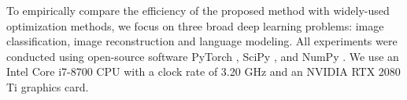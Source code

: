 To empirically compare the efficiency of the proposed method with widely-used optimization methods, we focus on three broad deep learning problems: image classification, image reconstruction and language modeling. All experiments were conducted using open-source software PyTorch \citep{NEURIPS2019_9015}, SciPy \citep{2020SciPy-NMeth}, and NumPy \citep{harris2020array}. We use an Intel Core i7-8700 CPU with a clock rate of 3.20 GHz and an NVIDIA RTX 2080 Ti graphics card.


%		 


